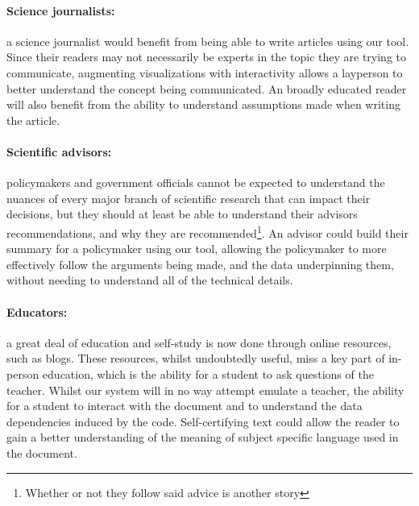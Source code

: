 \paragraph{Science journalists:} a science journalist would benefit from being able to write articles using
our tool. Since their readers may not necessarily be experts in the topic they are trying to communicate,
augmenting visualizations with interactivity allows a layperson to better understand the concept being
communicated. An broadly educated reader will also benefit from the ability to understand assumptions made
when writing the article.

\paragraph{Scientific advisors:} policymakers and government officials cannot be expected to understand the
nuances of every major branch of scientific research that can impact their decisions, but they should at least
be able to understand their advisors recommendations, and why they are recommended\footnote{Whether or not
they follow said advice is another story}. An advisor could build their summary for a policymaker using our
tool, allowing the policymaker to more effectively follow the arguments being made, and the data underpinning
them, without needing to understand all of the technical details.

\paragraph{Educators:} a great deal of education and self-study is now done through online resources, such as
blogs. These resources, whilst undoubtedly useful, miss a key part of in-person education, which is the
ability for a student to ask questions of the teacher. Whilst our system will in no way attempt emulate a
teacher, the ability for a student to interact with the document and to understand the data dependencies
induced by the code. Self-certifying text could allow the reader to gain a better understanding of the meaning
of subject specific language used in the document.

